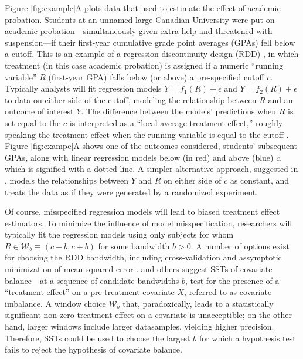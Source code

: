 \documentclass[12pt]{article}\usepackage[]{graphicx}\usepackage[]{color}
\begin{document}
Figure \ref{fig:example}A plots data that \citet{lso} used to estimate the effect of academic
probation.
Students at an unnamed large Canadian University were put on academic
probation---simultaneously given extra help and threatened with
suspension---if their first-year cumulative grade point averages
(GPAs) fell below a cutoff.
This is an example of a regression discontinuity design (RDD) \citep{thistlewhiteCampbell}, in
which treatment (in this case academic probation) is assigned if a
numeric ``running variable'' $R$ (first-year GPA) falls below (or above) a
pre-specified cutoff $c$.
Typically \citep[e.g.][]{imbensLemiuxRDD,angristLavy,lee} analysts
will fit regression models $Y=f_1(R)+\epsilon$ and $Y=f_2(R)+\epsilon$
to data on either side of the cutoff, modeling the relationship
between $R$ and an outcome of interest $Y$.
The difference between the models' predictions when $R$ is set equal
to the $c$ is interpreted as a ``local
average treatment effect,'' roughly speaking the treatment effect when
the running variable is equal to the cutoff \citep{HTV}.
Figure \ref{fig:exampe}A shows one of the outcomes \citet{lso} considered,
students' subsequent GPAs, along with linear regression models below
(in red) and above (blue) $c$, which is signified with a dotted
line.
A simpler alternative approach, suggested in \citet{cft}, models the
relationships between $Y$ and $R$ on either side of $c$ as constant,
and treats the data as if they were generated by a randomized
experiment.

Of course, misspecified regression models will lead to biased
treatment effect estimators.
To minimize the influence of model misspecification, researchers will
typically fit the regression models using only subjects for whom $R\in
\mathcal{W}_b\equiv (c-b,c+b)$ for some bandwidth $b>0$.
A number of options exist for choosing the RDD bandwidth, including
cross-validation \citep{ludwigMiller} and assymptotic minimization of
mean-squared-error \citep{IK}.
\citet{cft} and others \citet{salesHansen,angristWanna} suggest SSTs
of covariate balance---at a sequence of candidate bandwidths $b$, test
for the presence of a ``treatment effect'' on a pre-treatment
covariate $X$, referred to as covariate imbalance.
A window choice $\mathcal{W}_b$ that, paradoxically, leads to a
statistically significant
non-zero treatment effect on a covariate is unacceptible; on the other
hand, larger windows include larger datasamples, yielding higher
precision.
Therefore, SSTs could be used to choose the largest $b$ for which a
hypothesis test fails to reject the hypothesis of covariate balance.
\end{document}
